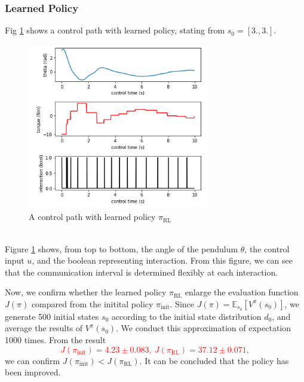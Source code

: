 \documentclass[english, dvipdfmx]{ampmt}             %
\newcommand{\unc}[1]{\textcolor{red}{#1}} %
\newcommand{\expect}{\mathbb{E}}
\begin{document}
\subsubsection{Learned Policy}
Fig \ref{path_l} shows a control path with learned policy, stating from $s_0 = [3., 3.]$.
\begin{figure}[h]
	\centering
 	\includegraphics[width=8cm]{path_l.png}
 	\caption{A control path with learned policy $\pi_{\textrm{RL}}$} \label{path_l}
\end{figure}\\
Figure \ref{path_l} shows, from top to bottom, the angle of the pendulum $\theta$, the control input $u$, and the boolean representing interaction. From this figure, we can see that the communication interval is determined flexibly at each interaction.\par
Now, we confirm whether the learned policy $\pi_{\textrm{RL}}$ enlarge the evaluation function $J(\pi)$ compared from the initital policy $\pi_{\textrm{init}}$. Since $J(\pi) = \expect_{s_0}[V^{\pi}(s_0)]$, we generate 500 initial states $s_0$ according to the initial state distribution $d_0$, and average the results of $V^{\pi}(s_0)$. We conduct this approximation of expectation 1000 times. From the result
\unc{
\begin{equation}
	J(\pi_{\textrm{init}}) = 4.23 \pm 0.083,~J(\pi_{\textrm{RL}}) = 37.12 \pm 0.071 \label{compare_policy}, 
\end{equation}
}
we can confirm $J(\pi_{\textrm{init}}) < J(\pi_{\textrm{RL}})$. It can be concluded that the policy has been improved.
\end{document}

